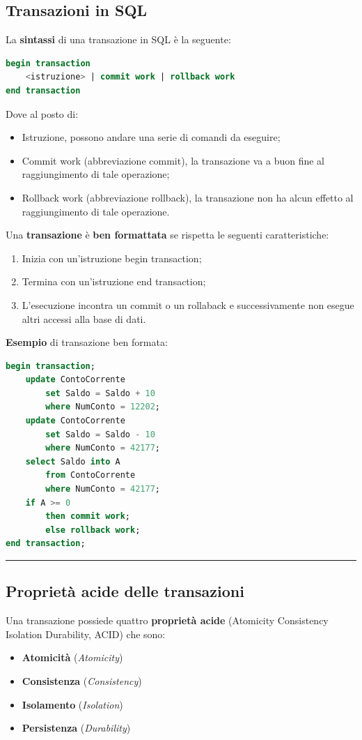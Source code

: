 \documentclass[a4paper]{article}
\newcommand{\longline}{\noindent\rule{\textwidth}{0.4pt}}
\begin{document}
	\subsection{Transazioni in SQL}
	
	La \textbf{sintassi} di una transazione in SQL è la seguente:
	\begin{lstlisting}[language=SQL]
begin transaction
	<istruzione> | commit work | rollback work
end transaction
	\end{lstlisting}
	Dove al posto di:
	\begin{itemize}
		\item \textsf{Istruzione}, possono andare una serie di comandi da eseguire;
		\item \textsf{Commit work} (abbreviazione \textsf{commit}), la transazione va a buon fine al raggiungimento di tale operazione;
		\item \textsf{Rollback work} (abbreviazione \textsf{rollback}), la transazione non ha alcun effetto al raggiungimento di tale operazione.
	\end{itemize}
	Una \textbf{transazione} è \textbf{ben formattata} se rispetta le seguenti caratteristiche:
	\begin{enumerate}
		\item Inizia con un'istruzione \textsf{begin transaction};
		\item Termina con un'istruzione \textsf{end transaction};
		\item L'esecuzione incontra un \textsf{commit} o un \textsf{rollaback} e successivamente non esegue altri accessi alla base di dati.
	\end{enumerate}\newpage

	\noindent
	\textcolor{Green4}{\textbf{Esempio}} di transazione ben formata:
	\begin{lstlisting}[language=SQL]
begin transaction;
	update ContoCorrente
		set Saldo = Saldo + 10
		where NumConto = 12202;
	update ContoCorrente
		set Saldo = Saldo - 10
		where NumConto = 42177;
	select Saldo into A
		from ContoCorrente
		where NumConto = 42177;
	if A >= 0
		then commit work;
		else rollback work;
end transaction;
	\end{lstlisting}

	\longline
	
	\subsection{Proprietà acide delle transazioni}
	
	Una transazione possiede quattro \textcolor{Red3}{\textbf{proprietà acide}} (Atomicity Consistency Isolation Durability, ACID) che sono:
	\begin{itemize}
		\item \textbf{Atomicità} (\emph{Atomicity})
		\item \textbf{Consistenza} (\emph{Consistency})
		\item \textbf{Isolamento} (\emph{Isolation})
		\item \textbf{Persistenza} (\emph{Durability})
	\end{itemize}
	
\end{document}
